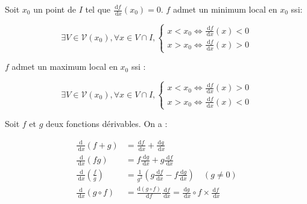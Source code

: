 Soit $x_0$ un point de $I$ tel que $\frac{\mathrm{d} f}{\mathrm{~d} x}\left(x_0\right)=0$. $f$ admet un minimum local en $x_0$ ssi:

$$
\exists V \in \mathcal{V}\left(x_0\right), \forall x \in V \cap I,\left\{\begin{array}{l}
x<x_0 \Longleftrightarrow \frac{\mathrm{~d} f}{\mathrm{~d} x}(x)<0 \\
x>x_0 \Longleftrightarrow \frac{\mathrm{~d} f}{\mathrm{~d} x}(x)>0
\end{array}\right.
$$

$f$ admet un maximum local en $x_0$ ssi :

$$
\exists V \in \mathcal{V}\left(x_0\right), \forall x \in V \cap I,\left\{\begin{array}{l}
x<x_0 \Longleftrightarrow \frac{\mathrm{~d} f}{\mathrm{~d} x}(x)>0 \\
x>x_0 \Longleftrightarrow \frac{\mathrm{~d} f}{\mathrm{~d} x}(x)<0
\end{array}\right.
$$

Soit $f$ et $g$ deux fonctions dérivables. On a :

$$
\begin{aligned}
\frac{\mathrm{d}}{\mathrm{~d} x}(f+g) & =\frac{\mathrm{d} f}{\mathrm{~d} x}+\frac{\mathrm{d} g}{\mathrm{~d} x} \\
\frac{\mathrm{~d}}{\mathrm{~d} x}(f g) & =f \frac{\mathrm{~d} g}{\mathrm{~d} x}+g \frac{\mathrm{~d} f}{\mathrm{~d} x} \\
\frac{\mathrm{~d}}{\mathrm{~d} x}\left(\frac{f}{g}\right) & =\frac{1}{g^2}\left(g \frac{\mathrm{~d} f}{\mathrm{~d} x}-f \frac{\mathrm{~d} g}{\mathrm{~d} x}\right) \quad(g \neq 0) \\
\frac{\mathrm{d}}{\mathrm{~d} x}(g \circ f) & =\frac{\mathrm{d}(g \circ f)}{\mathrm{d} f} \frac{\mathrm{~d} f}{\mathrm{~d} x}=\frac{\mathrm{d} g}{\mathrm{~d} x} \circ f \times \frac{\mathrm{d} f}{\mathrm{~d} x}
\end{aligned}
$$

